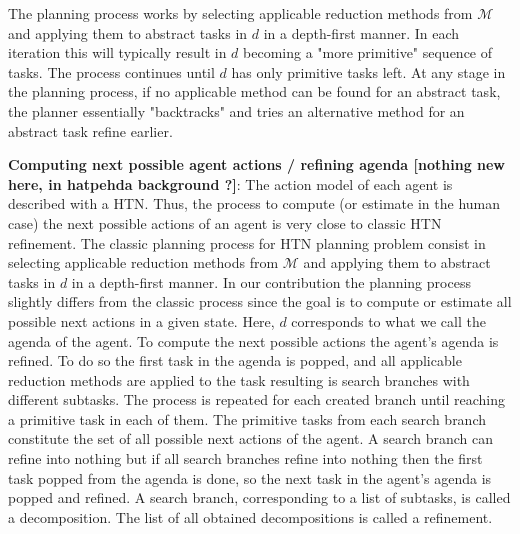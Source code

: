 \documentclass[letterpaper]{article} %
\begin{document}
The planning process works by selecting applicable reduction methods from $\mathcal{M}$ and applying them to abstract tasks in $d$ in a depth-first manner. In each iteration this will typically result in $d$ becoming a "more primitive" sequence of tasks. The process continues until $d$ has only primitive tasks left. At any stage in the planning process, if no applicable method can be found for an abstract task, the planner essentially "backtracks" and tries an alternative method for an abstract task refine earlier.

\textbf{Computing next possible agent actions / refining agenda [nothing new here, in hatpehda background ?]}:
The action model of each agent is described with a HTN. Thus, the process to compute (or estimate in the human case) the next possible actions of an agent is very close to classic HTN refinement.
The classic planning process for HTN planning problem consist in selecting applicable reduction methods from $\mathcal{M}$ and applying them to abstract tasks in $d$ in a depth-first manner. In our contribution the planning process slightly differs from the classic process since the goal is to compute or estimate all possible next actions in a given state. 
Here, $d$ corresponds to what we call the agenda of the agent. To compute the next possible actions the agent's agenda is refined. To do so the first task in the agenda is popped, and all applicable reduction methods are applied to the task resulting is search branches with different subtasks. The process is repeated for each created branch until reaching a primitive task in each of them. The primitive tasks from each search branch constitute the set of all possible next actions of the agent.
A search branch can refine into nothing but if all search branches refine into nothing then the first task popped from the agenda is done, so the next task in the agent's agenda is popped and refined. 
A search branch, corresponding to a list of subtasks, is called a decomposition. The list of all obtained decompositions is called a refinement.  
\end{document}
